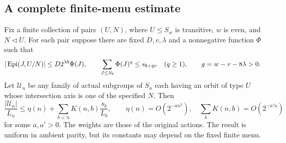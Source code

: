 \subsection{A complete finite-menu estimate}
\begin{theorem}\label{thm:fusion}
Fix a finite collection of pairs $(U,N)$, where $U\leq S_w$ is
transitive, $w$ is even, and $N\lhd U$. For each pair suppose there
are fixed $D,v,\lambda$ and a nonnegative function $\Phi$ such that
\[
 |\operatorname{Epi}(J,U/N)|\leq D2^{\lambda b}\Phi(J),\qquad
 \sum_{J\leq S_b}\Phi(J)^q\leq s_{b+qv}\quad(q\geq1),
 \qquad g=w-v-8\lambda>0.
\]
Let $\mathcal U_n$ be any family of actual subgroups of $S_n$ each
having an orbit of type $U$ whose intersection axis is one of the
specified $N$. Then
\begin{equation}\label{eq:finite-fusion}
 \frac{|\mathcal U_n|}{L_n}
 \leq\eta(n)+\sum_{b<n}K(n,b)\frac{s_b}{L_b},
 \qquad\eta(n)=O(2^{-a n^2}),\quad
 \sum_bK(n,b)=O(2^{-a' n})
\end{equation}
for some $a,a'>0$. The weights are those of the original actions.
The result is uniform in ambient parity, but its constants may depend
on the fixed finite menu.
\end{theorem}
